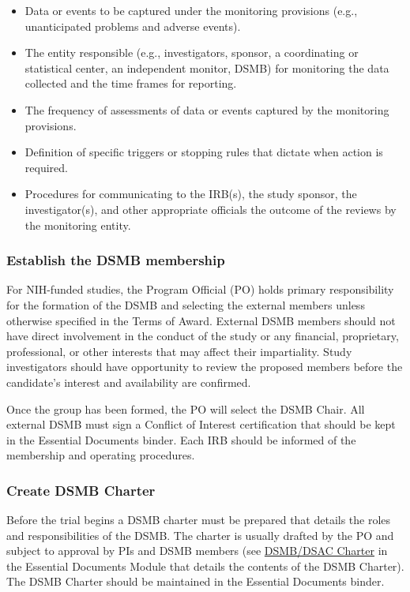\documentclass[]{book}
\providecommand{\tightlist}{%
  \setlength{\itemsep}{0pt}\setlength{\parskip}{0pt}}
\theoremstyle{definition}
\theoremstyle{definition}
\theoremstyle{definition}
\theoremstyle{remark}
\begin{document}
\begin{itemize}
\tightlist
\item
  Data or events to be captured under the monitoring provisions (e.g.,
  unanticipated problems and adverse events).
\item
  The entity responsible (e.g., investigators, sponsor, a coordinating
  or statistical center, an independent monitor, DSMB) for monitoring
  the data collected and the time frames for reporting.
\item
  The frequency of assessments of data or events captured by the
  monitoring provisions.
\item
  Definition of specific triggers or stopping rules that dictate when
  action is required.
\item
  Procedures for communicating to the IRB(s), the study sponsor, the
  investigator(s), and other appropriate officials the outcome of the
  reviews by the monitoring entity.
\end{itemize}

\subsubsection{Establish the DSMB
membership}\label{establish-the-dsmb-membership}

For NIH-funded studies, the Program Official (PO) holds primary
responsibility for the formation of the DSMB and selecting the external
members unless otherwise specified in the Terms of Award. External DSMB
members should not have direct involvement in the conduct of the study
or any financial, proprietary, professional, or other interests that may
affect their impartiality. Study investigators should have opportunity
to review the proposed members before the candidate's interest and
availability are confirmed.

Once the group has been formed, the PO will select the DSMB Chair. All
external DSMB must sign a Conflict of Interest certification that should
be kept in the Essential Documents binder. Each IRB should be informed
of the membership and operating procedures.

\subsubsection{Create DSMB Charter}\label{create-dsmb-charter}

Before the trial begins a DSMB charter must be prepared that details the
roles and responsibilities of the DSMB. The charter is usually drafted
by the PO and subject to approval by PIs and DSMB members (see
\href{https://ifar-isac.github.io/book/essential-documentations.html\#dsmbdsac-charter}{DSMB/DSAC
Charter} in the Essential Documents Module that details the contents of
the DSMB Charter). The DSMB Charter should be maintained in the
Essential Documents binder.
\end{document}
